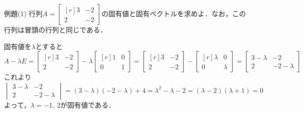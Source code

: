 \begin{tip}{例題(1)}
	行列$A = 
	\begin{bmatrix*}[r]
		3 & -2\\ 2 & -2
	\end{bmatrix*}$の固有値と固有ベクトルを求めよ．なお，この行列は冒頭の行列と同じである．

	\tcblower

	固有値を$\lambda$とすると
	\begin{equation*}
		A - \lambda E =
			\begin{bmatrix*}[r]
				3 & -2\\ 2 & -2
			\end{bmatrix*}
			- \lambda
			\begin{bmatrix*}[r]
				1 & 0\\ 0 & 1
			\end{bmatrix*}
		= 
			\begin{bmatrix*}[r]
				3 & -2\\ 2 & -2
			\end{bmatrix*}
			- 
			\begin{bmatrix*}[r]
				\lambda & 0\\ 0 & \lambda
			\end{bmatrix*}
		=
		\begin{bmatrix}
			3 - \lambda & -2\\ 2 & -2 - \lambda
		\end{bmatrix}
	\end{equation*}
	これより
	\begin{equation*}
		\begin{vmatrix}
			3 - \lambda & -2\\ 2 & -2 - \lambda
		\end{vmatrix}
		= (3 - \lambda)(-2 - \lambda) + 4 = \lambda^2 - \lambda - 2 = (\lambda - 2)(\lambda + 1) = 0
	\end{equation*}
	よって，$\lambda = -1,\ 2$が固有値である．


\end{tip}
